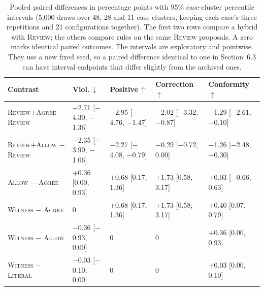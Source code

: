 \documentclass[acmsmall,review]{acmart}
\newcommand{\agree}{\textsc{Agree}}
\newcommand{\allow}{\textsc{Allow}}
\newcommand{\literal}{\textsc{Literal}}
\newcommand{\witness}{\textsc{Witness}}
\newcommand{\review}{\textsc{Review}}
\begin{document}
\begin{table}[H]
\centering
\caption{Pooled paired differences in percentage points with 95\% case-cluster percentile intervals (5,000 draws over 48, 28 and 11 case clusters, keeping each case's three repetitions and 21 configurations together). The first two rows compare a hybrid with \review{}; the others compare rules on the same \review{} proposals. A zero marks identical paired outcomes. The intervals are exploratory and pointwise. They use a new fixed seed, so a paired difference identical to one in Section~6.3 can have interval endpoints that differ slightly from the archived ones.}\label{tab:L6}
\footnotesize
\setlength{\tabcolsep}{3pt}
\begin{tabular}{@{}lllll@{}}
\toprule
\textbf{Contrast} & \textbf{Viol.\,$\downarrow$} & \textbf{Positive\,$\uparrow$} & \textbf{Correction\,$\uparrow$} & \textbf{Conformity\,$\uparrow$} \\
\midrule
\review{}+\agree{} $-$ \review{} & $-$2.71 [$-$4.30, $-$1.36] & $-$2.95 [$-$4.76, $-$1.47] & $-$2.02 [$-$3.32, $-$0.87] & $-$1.29 [$-$2.61, $-$0.10] \\
\review{}+\allow{} $-$ \review{} & $-$2.35 [$-$3.90, $-$1.06] & $-$2.27 [$-$4.08, $-$0.79] & $-$0.29 [$-$0.72, 0.00] & $-$1.26 [$-$2.48, $-$0.30] \\
\allow{} $-$ \agree{} & +0.36 [0.00, 0.93] & +0.68 [0.17, 1.36] & +1.73 [0.58, 3.17] & +0.03 [$-$0.66, 0.63] \\
\witness{} $-$ \agree{} & 0 & +0.68 [0.17, 1.36] & +1.73 [0.58, 3.17] & +0.40 [0.07, 0.79] \\
\witness{} $-$ \allow{} & $-$0.36 [$-$0.93, 0.00] & 0 & 0 & +0.36 [0.00, 0.93] \\
\witness{} $-$ \literal{} & $-$0.03 [$-$0.10, 0.00] & 0 & 0 & +0.03 [0.00, 0.10] \\
\bottomrule
\end{tabular}
\end{table}
\end{document}
